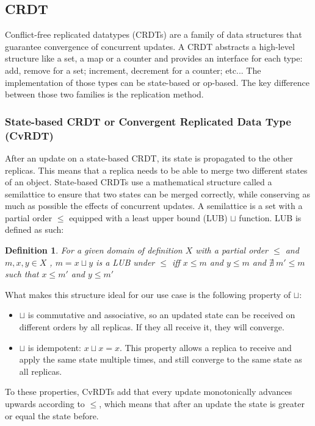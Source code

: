 \documentclass[11pt]{article}
\newcommand\bulletitem{\item[$\bullet$]}
\newtheorem*{mydef}{Definition}
\begin{document}
\subsection{CRDT}

Conflict-free replicated datatypes (CRDTs) are a family of data structures
that guarantee convergence of concurrent updates. A CRDT abstracts a
high-level structure like a set, a map or a counter and provides an interface
for each type: add, remove for a set; increment, decrement for a counter;
etc... The implementation of those types can be state-based or op-based. The
key difference between those two families is the replication method.  

\subsubsection{State-based CRDT or Convergent Replicated Data Type (CvRDT)}

After an update on a state-based CRDT, its state is propagated to the other
replicas. This means that a replica needs to be able to merge two different
states of an object. State-based CRDTs use a mathematical structure called a
semilattice to ensure that two states can be merged correctly, while
conserving as much as possible the effects of concurrent updates. A
semilattice is a set with a partial order $\leq$ equipped with a least upper
bound (LUB) $\sqcup$ function. LUB is defined as such:

\begin{mydef}
For a given domain of definition $X$ with a partial order $\leq$ and $m, x, y
\in X$ , $m = x \sqcup y$ is a LUB under $\leq$ iff $x \leq m$ and $y \leq m$
and $\nexists\ m' \leq m$ such that $x \leq m'$ and $y \leq m'$
\end{mydef}
What makes this structure ideal for our use case is the following property
of $\sqcup$:
\begin{itemize}
	\bulletitem $\sqcup$ is commutative and associative, so an updated state
	can be received on different orders by all replicas. If they all receive
	it, they will converge.
	
	\bulletitem $\sqcup$ is idempotent: $x \sqcup x = x$. This property allows
	a replica to receive and apply the same state multiple times, and still
	converge to the same state as all replicas.
\end{itemize}

To these properties, CvRDTs add that every update monotonically advances
upwards according to $\leq$, which means that after an update the state is
greater or equal the state before.
\end{document}
